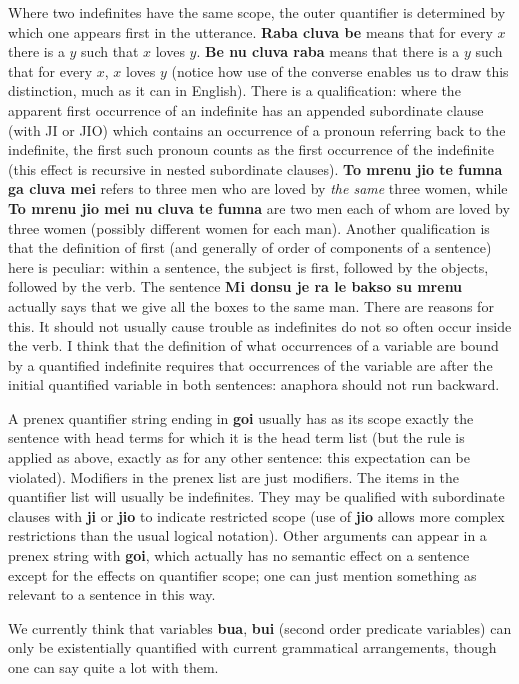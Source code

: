 \documentclass[12pt]{book}
\begin{document}
{Where two indefinites have the same scope, the outer quantifier is determined by which one appears first in the utterance.    {\bf Raba cluva be} means that for every $x$ there is a $y$ such that $x$ loves $y$.  {\bf Be nu cluva raba} means that there is a $y$ such that for every $x$, $x$ loves $y$ (notice how use of the converse enables us to draw this distinction, much as it can in English).  There is a qualification:  where the apparent first occurrence of an indefinite has an appended subordinate clause (with JI or JIO) which contains an occurrence of a pronoun referring back to the indefinite, the first such pronoun counts as the first occurrence of the indefinite (this effect is recursive in nested subordinate clauses).  {\bf To mrenu jio te fumna ga cluva mei} refers to three men who are loved by {\em the same\/} three women, while {\bf To mrenu jio mei nu cluva te fumna} are two men each of whom are loved by three women (possibly different women for each man).  Another qualification is that the  definition of first (and generally of order of components of a sentence) here is peculiar:  within a sentence, the subject is first, followed by the objects, followed by the verb.
The sentence {\bf Mi donsu je ra le bakso su mrenu} actually says that we give all the boxes to the same man.  There are reasons for this.  It should not usually cause trouble as indefinites do not so often occur inside the verb.  I think that the definition of what occurrences of a variable are bound by a quantified indefinite requires that occurrences of the variable are after the initial quantified variable in both sentences:  anaphora should not run backward.

A prenex quantifier string ending in {\bf goi} usually has as its scope exactly the sentence with head terms for which it is the head term list (but the rule is applied as above, exactly as for any other sentence:  this expectation can be violated).  Modifiers
in the prenex list are just modifiers.  The items in the quantifier list will usually be indefinites.  They may be qualified with subordinate clauses with
{\bf ji} or {\bf jio} to indicate restricted scope (use of {\bf jio} allows more complex restrictions than the usual logical notation).   Other arguments can appear in a prenex string with {\bf goi}, which actually has no semantic effect on
a sentence except for the effects on quantifier scope;  one can just mention something as relevant to a sentence in this way.

We currently think that variables {\bf bua}, {\bf bui} (second order predicate variables) can only be existentially quantified with current grammatical arrangements, though one can say quite a lot with them.

}
\end{document}
